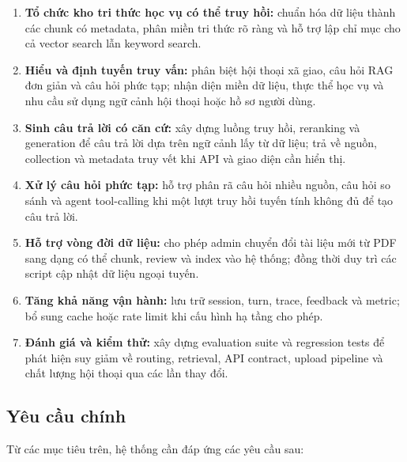 \documentclass[../DoAn.tex]{subfiles}
\begin{document}
\begin{enumerate}
    \item \textbf{Tổ chức kho tri thức học vụ có thể truy hồi:} chuẩn hóa dữ liệu
    thành các chunk có metadata, phân miền tri thức rõ ràng và hỗ trợ lập chỉ
    mục cho cả vector search lẫn keyword search.

    \item \textbf{Hiểu và định tuyến truy vấn:} phân biệt hội thoại xã giao, câu
    hỏi RAG đơn giản và câu hỏi phức tạp; nhận diện miền dữ liệu, thực thể học vụ
    và nhu cầu sử dụng ngữ cảnh hội thoại hoặc hồ sơ người dùng.

    \item \textbf{Sinh câu trả lời có căn cứ:} xây dựng luồng truy hồi, reranking
    và generation để câu trả lời dựa trên ngữ cảnh lấy từ dữ liệu; trả về nguồn,
    collection và metadata truy vết khi API và giao diện cần hiển thị.

    \item \textbf{Xử lý câu hỏi phức tạp:} hỗ trợ phân rã câu hỏi nhiều nguồn,
    câu hỏi so sánh và agent tool-calling khi một lượt truy hồi tuyến tính không
    đủ để tạo câu trả lời.

    \item \textbf{Hỗ trợ vòng đời dữ liệu:} cho phép admin chuyển đổi tài liệu
    mới từ PDF sang dạng có thể chunk, review và index vào hệ thống; đồng thời
    duy trì các script cập nhật dữ liệu ngoại tuyến.

    \item \textbf{Tăng khả năng vận hành:} lưu trữ session, turn, trace, feedback
    và metric; bổ sung cache hoặc rate limit khi cấu hình hạ tầng cho phép.

    \item \textbf{Đánh giá và kiểm thử:} xây dựng evaluation suite và regression
    tests để phát hiện suy giảm về routing, retrieval, API contract, upload
    pipeline và chất lượng hội thoại qua các lần thay đổi.
\end{enumerate}

\subsection{Yêu cầu chính}

Từ các mục tiêu trên, hệ thống cần đáp ứng các yêu cầu sau:
\end{document}
